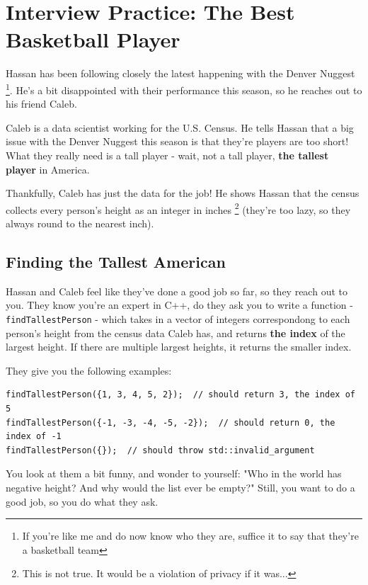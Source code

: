 \documentclass [12pt]{article}
\begin{document}
\pagebreak
\section{Interview Practice: The Best Basketball Player}
 Hassan has been following closely the latest happening with the Denver Nuggest \footnote{If you're like me and do now know who they are, suffice it to say that they're a basketball team}. He's a bit disappointed with their performance this season, so he reaches out to his friend Caleb. 

Caleb is a data scientist working for the U.S. Census. He tells Hassan that a big issue with the Denver Nuggest this season is that they're players are too short! What they really need is a tall player - wait, not a tall player, \textbf{the tallest player} in America.

Thankfully, Caleb has just the data for the job! He shows Hassan that the census collects every person's height as an integer in inches \footnote{This is not true. It would be a violation of privacy if it was...} (they're too lazy, so they always round to the nearest inch).


\subsection{Finding the Tallest American}
 Hassan and Caleb feel like they've done a good job so far, so they reach out to you. They know you're an expert in C++, do they ask you to write a function - \texttt{findTallestPerson} - which takes in a vector of integers correspondong to each person's height from the census data Caleb has, and returns \textbf{the index} of the largest height. If there are multiple largest heights, it returns the smaller index.

They give you the following examples:

\vspace{2em}
\begin{verbatim}
findTallestPerson({1, 3, 4, 5, 2});  // should return 3, the index of 5
findTallestPerson({-1, -3, -4, -5, -2});  // should return 0, the index of -1
findTallestPerson({});  // should throw std::invalid_argument
\end{verbatim}

You look at them a bit funny, and wonder to yourself: "Who in the world has negative height? And why would the list ever be empty?" Still, you want to do a good job, so you do what they ask.
\end{document}
